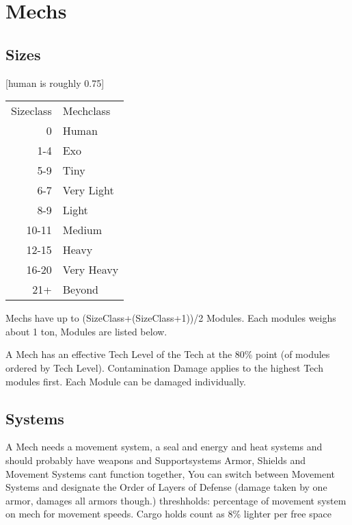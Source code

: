 \documentclass{article}
\begin{document}
    \section{Mechs}

    \subsection{Sizes}
    [human is roughly 0.75]\par
    \begin{tabular}{r|l}
        Sizeclass &Mechclass \\
          0 &Human\\
        1-4 &Exo\\
        5-9 &Tiny\\
        6-7 &Very Light\\
        8-9 &Light\\
        10-11 &Medium\\
        12-15 &Heavy\\
        16-20 &Very Heavy\\
        21+ &Beyond\\
    \end{tabular}\newline
    Mechs have up to (SizeClass+(SizeClass+1))/2 Modules. Each modules weighs about 1 ton, Modules are listed below. \par
    A Mech has an effective Tech Level of the Tech at the 80\% point (of modules ordered by Tech Level).\newline
    Contamination Damage applies to the highest Tech modules first. Each Module can be damaged individually.\newline
    \newline

    \subsection{Systems}
    A Mech needs a movement system, a seal and energy and heat systems and should probably have weapons and Supportsystems\newline
    Armor, Shields and Movement Systems cant function together, You can switch between Movement Systems and designate the
    Order of Layers of Defense (damage taken by one armor, damages all armors though.)
    threshholds: percentage of movement system on mech for movement speeds. Cargo holds count as 8\% lighter per
    free space\newline
\end{document}
